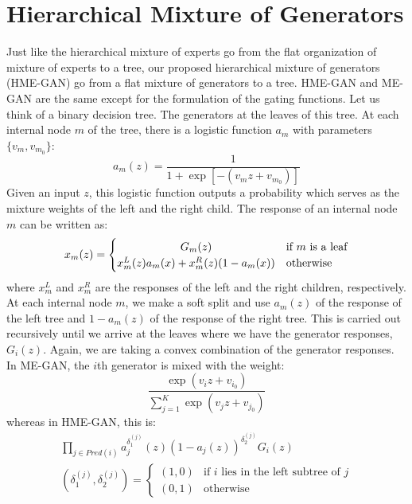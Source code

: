 \documentclass[a4paper,onesided,12pt]{report}
\begin{document}
\section{Hierarchical Mixture of Generators}
\label{sec:hmgan}
Just like the hierarchical mixture of experts \cite{jordan1994hierarchical} go from the flat organization of mixture of experts  \cite{jacobs1991adaptive} to a tree, our proposed hierarchical mixture of generators (HME-GAN) go from a flat mixture of generators to a tree. HME-GAN and ME-GAN are the same except for the formulation of the gating functions. Let us think of a binary decision tree. The generators at the leaves of this tree. At each internal node $m$ of the tree, there is a logistic function $a_m$ with parameters $\{v_m, v_{m_0}\}$:
\begin{equation}
a_m(z) = \frac{1}{1+\exp{[-(v_m z + v_{m_0})]}}
\label{eq:sigmoid}
\end{equation}
Given an input $z$, this logistic function outputs a probability which serves as the mixture weights of the left and the right child. The response of an internal node $m$ can be written as:
\begin{equation}
x_m(z)=
	\begin{cases}
		\hfil G_m(z) &\text{if $m$ is a leaf} \\
		\hfil x_m^{L}(z) a_m(x) + x_m^{R}(z)(1 - a_m(x)) &\text{otherwise}
	\end{cases}
\label{eq:hmgan2}
\end{equation}
where $x_m^L$ and $x_m^R$ are the responses of the left and the right children, respectively. At each internal node $m$, we make a soft split and use $a_m(z)$ of the response of the left tree and $1-a_m(z)$ of the response of the right tree. This is carried out recursively until we arrive at the leaves where we have the generator responses, $G_i(z)$. Again, we are taking a convex combination of the generator responses. In ME-GAN, the $i$th generator is mixed with the weight:
\begin{equation}
\frac{\exp{(v_i z + v_{i_0})}}{\sum_{j=1}^K \exp{(v_j z + v_{j_0})}}
\label{eq:fm_mix}
\end{equation}
whereas in HME-GAN, this is:
\begin{gather}
\prod_{j \in Pred(i)} a_j^{\delta_1^{(j)}}(z) (1-a_j(z))^{\delta_2^{(j)}} G_i(z)\\
(\delta_1^{(j)}, \delta_2^{(j)}) =
	\begin{cases}
		(1, 0) & \text{if $i$ lies in the left subtree of $j$} \\
		(0, 1) & \text{otherwise}	
	\end{cases}
\label{eq:hm_mix}
\end{gather}
\end{document}
